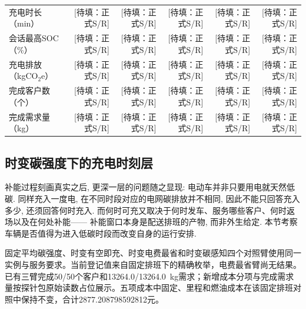 \documentclass{setp-new}
\DeclareRobustCommand{\TBD}[1]{%
  \begingroup\setlength{\fboxsep}{1.2pt}%
  \colorbox{black!12}{\textcolor{black!65}{\textsf{\footnotesize[待填：#1]}}}%
  \endgroup}
\begin{document}
\begin{table}[htbp]
{\begin{tabular}{lrrrrr}
    充电时长（min） & \TBD{正式S/R} & \TBD{正式S/R} & \TBD{正式S/R} & \TBD{正式S/R} & \TBD{正式S/R}\\
    会话最高SOC（\%） & \TBD{正式S/R} & \TBD{正式S/R} & \TBD{正式S/R} & \TBD{正式S/R} & \TBD{正式S/R}\\
    充电排放（kgCO$_2$e） & \TBD{正式S/R} & \TBD{正式S/R} & \TBD{正式S/R} & \TBD{正式S/R} & \TBD{正式S/R}\\
    完成客户数（个） & \TBD{正式S/R} & \TBD{正式S/R} & \TBD{正式S/R} & \TBD{正式S/R} & \TBD{正式S/R}\\
    完成需求量（kg） & \TBD{正式S/R} & \TBD{正式S/R} & \TBD{正式S/R} & \TBD{正式S/R} & \TBD{正式S/R}\\
    \bottomrule
  \end{tabular}
  }
\end{table}

\subsection{时变碳强度下的充电时刻层}

补能过程刻画真实之后, 更深一层的问题随之显现:
电动车并非只要用电就天然低碳.
同样充入一度电, 在不同时段对应的电网碳排放并不相同,
因此不能只回答充入多少, 还须回答何时充入.
而何时可充又取决于何时发车、服务哪些客户、何时返场以及在何处补能——
补能窗口本身是配送排班的产物, 而非外生给定.
本节考察车辆是否值得为进入低碳时段而改变自身的运行安排.

固定平均碳强度、时变有空即充、时变电费最省和时变碳感知四个对照臂使用同一实例与服务要求。当前登记值来自固定排班下的精确枚举，电费最省臂尚无结果。已有三臂完成50/50个客户和13264.0/13264.0~kg需求；新增成本分项与完成需求量按探针包原始读数占位展示。五项成本中固定、里程和燃油成本在该固定排班对照中保持不变，合计2877.208798592812元。
\end{document}
